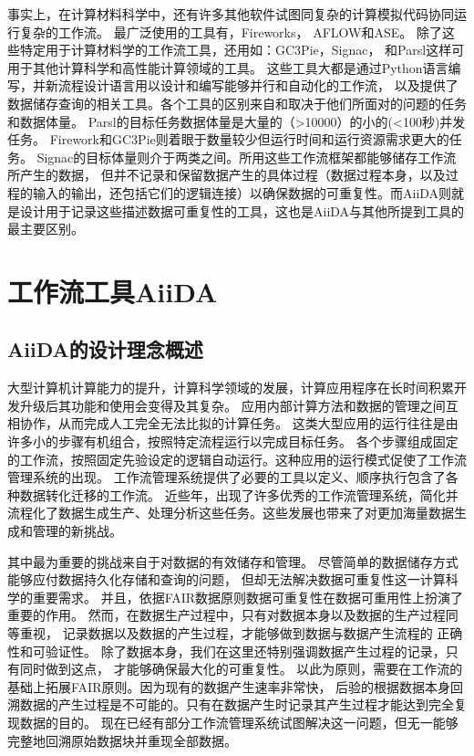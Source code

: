 事实上，在计算材料科学中，还有许多其他软件试图同复杂的计算模拟代码协同运行复杂的工作流。
最广泛使用的工具有，Fireworks\cite{jain2015fireworks}，
AFLOW\cite{curtarolo2012aflow}和ASE\cite{larsen2017atomic}。
除了这些特定用于计算材料学的工作流工具，还用如：GC3Pie\cite{maffioletti2012gc3pie}，Signac\cite{adorf2018simple}，
和Parsl\cite{babuji2019parsl}这样可用于其他计算科学和高性能计算领域的工具。
这些工具大都是通过Python语言编写，并新流程设计语言用以设计和编写能够并行和自动化的工作流，
以及提供了数据储存查询的相关工具。各个工具的区别来自和取决于他们所面对的问题的任务和数据体量。
Parsl的目标任务数据体量是大量的（>10000）的小的(<100秒)并发任务。
Firework和GC3Pie则着眼于数量较少但运行时间和运行资源需求更大的任务。
Signac的目标体量则介于两类之间。所用这些工作流框架都能够储存工作流所产生的数据，
但并不记录和保留数据产生的具体过程（数据过程本身，以及过程的输入的输出，还包括它们的逻辑连接）以确保数据的可重复性。而AiiDA则就是设计用于记录这些描述数据可重复性的工具，这也是AiiDA与其他所提到工具的最主要区别。

\section{工作流工具AiiDA}

\subsection{AiiDA的设计理念概述}

大型计算机计算能力的提升，计算科学领域的发展，计算应用程序在长时间积累开发升级后其功能和使用会变得及其复杂。
应用内部计算方法和数据的管理之间互相协作，从而完成人工完全无法比拟的计算任务。
这类大型应用的运行往往是由许多小的步骤有机组合，按照特定流程运行以完成目标任务。
各个步骤组成固定的工作流，按照固定先验设定的逻辑自动运行。这种应用的运行模式促使了工作流管理系统的出现。
工作流管理系统提供了必要的工具以定义、顺序执行包含了各种数据转化迁移的工作流。
近些年，出现了许多优秀的工作流管理系统，简化并流程化了数据生成生产、处理分析这些任务。这些发展也带来了对更加海量数据生成和管理的新挑战。

其中最为重要的挑战来自于对数据的有效储存和管理。
尽管简单的数据储存方式能够应付数据持久化存储和查询的问题，
但却无法解决数据可重复性这一计算科学的重要需求。
并且，依据FAIR数据原则\cite{wilkinson2016fair}数据可重复性在数据可重用性上扮演了重要的作用。
然而，在数据生产过程中，只有对数据本身以及数据的生产过程同等重视，
记录数据以及数据的产生过程，才能够做到数据与数据产生流程的
正确性和可验证性\cite{ioannidis2009repeatability, peng2011reproducible, stoddart2016there, allison2016reproducibility}。
除了数据本身，我们在这里还特别强调数据产生过程的记录，只有同时做到这点，
才能够确保最大化的可重复性。
以此为原则，需要在工作流的基础上拓展FAIR原则。因为现有的数据产生速率非常快，
后验的根据数据本身回溯数据的产生过程是不可能的。只有在数据产生时记录其产生过程才能达到完全复现数据的目的。
现在已经有部分工作流管理系统试图解决这一问题，但无一能够完整地回溯原始数据块并重现全部数据。

